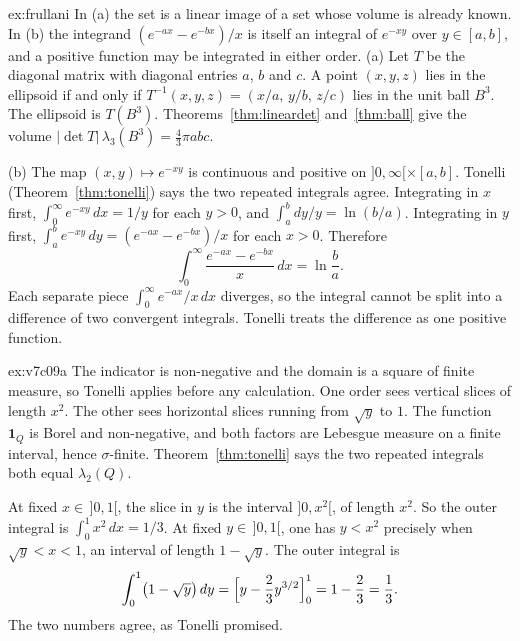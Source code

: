 \begin{solution}{ex:frullani}
\idea In (a) the set is a linear image of a set whose volume is already known. In (b) the integrand $(e^{-ax}-e^{-bx})/x$ is itself an integral of $e^{-xy}$ over $y\in[a,b]$, and a positive function may be integrated in either order.
\writeup (a) Let $T$ be the diagonal matrix with diagonal entries $a$, $b$ and $c$. A point $(x,y,z)$ lies in the ellipsoid if and only if $T^{-1}(x,y,z)=(x/a,\,y/b,\,z/c)$ lies in the unit ball $B^3$. The ellipsoid is $T(B^3)$. Theorems~\ref{thm:lineardet} and~\ref{thm:ball} give the volume $|\det T|\,\lambda_3(B^3)=\frac43\pi abc$.

(b) The map $(x,y)\mapsto e^{-xy}$ is continuous and positive on $]0,\infty[\times[a,b]$. Tonelli (Theorem~\ref{thm:tonelli}) says the two repeated integrals agree. Integrating in $x$ first, $\int_0^\infty e^{-xy}\,dx=1/y$ for each $y>0$, and $\int_a^b dy/y=\ln(b/a)$. Integrating in $y$ first, $\int_a^b e^{-xy}\,dy=(e^{-ax}-e^{-bx})/x$ for each $x>0$. Therefore
\[
\int_0^\infty\frac{e^{-ax}-e^{-bx}}{x}\,dx=\ln\frac ba.
\]
Each separate piece $\int_0^\infty e^{-ax}/x\,dx$ diverges, so the integral cannot be split into a difference of two convergent integrals. Tonelli treats the difference as one positive function.
\end{solution}

\begin{solution}{ex:v7c09a}
\idea The indicator is non-negative and the domain is a square of finite measure, so Tonelli applies before any calculation. One order sees vertical slices of length $x^2$. The other sees horizontal slices running from $\sqrt y$ to $1$.
\writeup The function $\mathbf 1_Q$ is Borel and non-negative, and both factors are Lebesgue measure on a finite interval, hence $\sigma$-finite. Theorem~\ref{thm:tonelli} says the two repeated integrals both equal $\lambda_2(Q)$.

At fixed $x\in\,]0,1[$, the slice in $y$ is the interval $]0,x^2[$, of length $x^2$. So the outer integral is $\int_0^1 x^2\,dx=1/3$. At fixed $y\in\,]0,1[$, one has $y<x^2$ precisely when $\sqrt y<x<1$, an interval of length $1-\sqrt y$. The outer integral is
\[
\int_0^1\bigl(1-\sqrt y\bigr)\,dy=\Bigl[y-\frac23 y^{3/2}\Bigr]_0^1=1-\frac23=\frac13.
\]
The two numbers agree, as Tonelli promised.
\end{solution}

